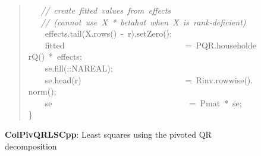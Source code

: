 \documentclass[shortnames,article]{jss}
\newcommand{\hlstd}[1]{\textcolor[rgb]{0,0,0}{#1}}
\newcommand{\hlopt}[1]{\textcolor[rgb]{0,0,0}{#1}}
\newcommand{\hlslc}[1]{\textcolor[rgb]{0.67,0.13,0.13}{\it{#1}}}
\newcommand{\hlkwd}[1]{\textcolor[rgb]{0,0,0}{#1}}
\begin{document}
\begin{figure}[htb]
\begin{quote}
    \hlstd{}\hlstd{\ \ \ }\hlstd{}\hlslc{//\ create\ fitted\ values\ from\ effects}\hspace*{\fill}\\
    \hlstd{}\hlstd{\ \ \ }\hlstd{}\hlslc{//\ (cannot\ use\ X\ {*}\ betahat\ when\ X\ is\ rank{-}deficient)}\hspace*{\fill}\\
    \hlstd{}\hlstd{\ \ \ \ }\hlstd{effects}\hlopt{.}\hlstd{}\hlkwd{tail}\hlstd{}\hlopt{(}\hlstd{X}\hlopt{.}\hlstd{}\hlkwd{rows}\hlstd{}\hlopt{()\ {-}\ }\hlstd{r}\hlopt{).}\hlstd{}\hlkwd{setZero}\hlstd{}\hlopt{();}\hspace*{\fill}\\
    \hlstd{}\hlstd{\ \ \ \ }\hlstd{fitted}\hlstd{\ \ \ \ \ \ \ \ \ \ \ \ \ \ \ \ \ \ \ \ \ \ \ \ \ \ \ \ \ }\hlstd{}\hlopt{=\ }\hlstd{PQR}\hlopt{.}\hlstd{}\hlkwd{householderQ}\hlstd{}\hlopt{()\ {*}\ }\hlstd{effects}\hlopt{;}\hspace*{\fill}\\
    \hlstd{}\hlstd{\ \ \ \ }\hlstd{se}\hlopt{.}\hlstd{}\hlkwd{fill}\hlstd{}\hlopt{(::}\hlstd{NA\textunderscore REAL}\hlopt{);}\hspace*{\fill}\\
    \hlstd{}\hlstd{\ \ \ \ }\hlstd{se}\hlopt{.}\hlstd{}\hlkwd{head}\hlstd{}\hlopt{(}\hlstd{r}\hlopt{)}\hlstd{\ \ \ \ \ \ \ \ \ \ \ \ \ \ \ \ \ \ \ \ \ \ \ \ \ }\hlopt{=\ }\hlstd{Rinv}\hlopt{.}\hlstd{}\hlkwd{rowwise}\hlstd{}\hlopt{().}\hlstd{}\hlkwd{norm}\hlstd{}\hlopt{();}\hspace*{\fill}\\
    \hlstd{}\hlstd{\ \ \ \ }\hlstd{se}\hlstd{\ \ \ \ \ \ \ \ \ \ \ \ \ \ \ \ \ \ \ \ \ \ \ \ \ \ \ \ \ \ \ \ \ }\hlstd{}\hlopt{=\ }\hlstd{Pmat\ }\hlopt{{*}\ }\hlstd{se}\hlopt{;}\hspace*{\fill}\\
    \hlstd{}\hlopt{\}}\hlstd{}\hspace*{\fill}
    \normalfont
    \normalsize
  \end{quote}
  \caption{\textbf{ColPivQRLSCpp}: Least squares using the pivoted QR decomposition}
  \label{ColPivQRLS}
\end{figure}
\end{document}

